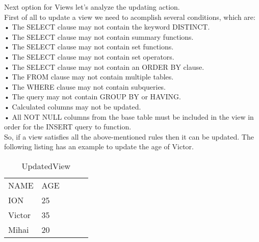 Next option for Views let's analyze the updating action.\\
First of all to update a view we need to acomplish several conditions, which are:\\
• The SELECT clause may not contain the keyword DISTINCT.\\
• The SELECT clause may not contain summary functions.\\
• The SELECT clause may not contain set functions.\\
• The SELECT clause may not contain set operators.\\
• The SELECT clause may not contain an ORDER BY clause.\\
• The FROM clause may not contain multiple tables.\\
• The WHERE clause may not contain subqueries.\\
• The query may not contain GROUP BY or HAVING.\\
• Calculated columns may not be updated.\\
• All NOT NULL columns from the base table must be included in the view in order for the INSERT query to function.\\

So, if a view satisfies all the above-mentioned rules then it can be updated. The following listing has an example to update the age of Victor.\\

\begin{table}[ht!]
\centering
\caption{UpdatedView}
\begin{tabular}{lllll}
NAME   & AGE &  &  &  \\
ION    & 25  &  &  &  \\
Victor & 35  &  &  &  \\
Mihai  & 20  &  &  & 
\end{tabular}
\end{table}

